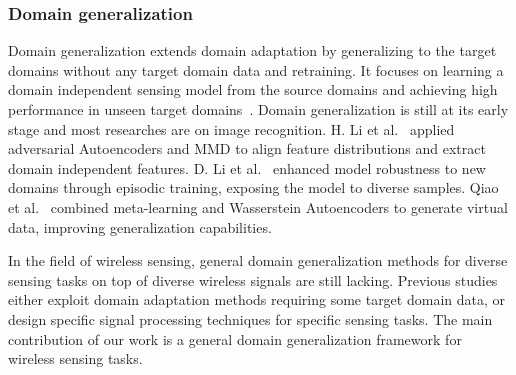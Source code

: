 \subsubsection{Domain generalization}
Domain generalization extends domain adaptation by generalizing to the target domains without any target domain data and retraining. It focuses on learning a domain independent sensing model from the source domains and achieving high performance in unseen target domains~\cite{WangJ:2022}. Domain generalization is still at its early stage and most researches are on image recognition. H. Li et al.~\cite{LiH:2018} applied adversarial Autoencoders and MMD to align feature distributions and extract domain independent features. D. Li et al.~\cite{LiD:2019} enhanced model robustness to new domains through episodic training, exposing the model to diverse samples. Qiao et al.~\cite{QiaoF:2020} combined meta-learning and Wasserstein Autoencoders to generate virtual data, improving generalization capabilities.   

In the field of wireless sensing, general domain generalization methods for diverse sensing tasks on top of diverse wireless signals are still lacking. Previous studies either exploit domain adaptation methods requiring some target domain data, or design specific signal processing techniques for specific sensing tasks. The main contribution of our work is a general domain generalization framework for wireless sensing tasks.